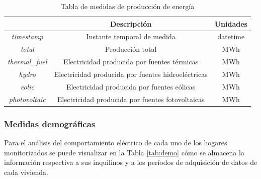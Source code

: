 \begin{table}[h!]
    \centering
    \begin{tabular}{|c|c|c|}
    \hline
    \rowcolor[HTML]{AAAAAA} 
    \multicolumn{1}{|c|}{\cellcolor[HTML]{AAAAAA}Campo} & \multicolumn{1}{c|}{\cellcolor[HTML]{AAAAAA}Descripción} & Unidades \\ \hline
    \textit{timestamp} & Instante temporal de medida & datetime \\ \hline
    \textit{total} & Producción total & MWh \\ \hline
    \textit{thermal\_fuel} & Electricidad producida por fuentes térmicas & MWh \\ \hline
    \textit{hydro} & Electricidad producida por fuentes hidroeléctricas & MWh \\ \hline
    \textit{eolic} & Electricidad producida por fuentes eólicas & MWh \\ \hline
    \textit{photovoltaic} & Electricidad producida por fuentes fotovoltaicas & MWh \\ \hline
    \end{tabular}
    \caption{Tabla de medidas de producción de energía \cite{sustdata}}
    \label{tab:prod}
\end{table}

\subsubsection{Medidas demográficas}

Para el análisis del comportamiento eléctrico de cada uno de los hogares monitorizados se puede visualizar en la Tabla \ref{tab:demo} cómo se almacena la información respectiva a sus inquilinos y a los períodos de adquisición de datos de cada vivienda.

\vspace{3mm}

